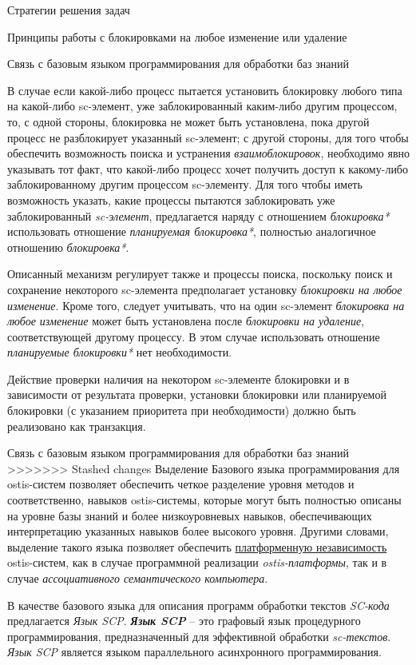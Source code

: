 \begin{frame}{Стратегии решения задач}
\begin{frame}{\large Принципы работы с блокировками на любое изменение или удаление}
\begin{frame}{Связь с базовым языком программирования для обработки баз
знаний}
\begin{frame}{}
В случае если какой-либо процесс пытается установить блокировку любого типа на какой-либо sc-элемент, уже заблокированный каким-либо другим процессом, то, с одной стороны, блокировка не может быть установлена, пока другой процесс не разблокирует указанный sc-элемент; с другой стороны, для того чтобы обеспечить возможность поиска и устранения \textit{взаимоблокировок}, необходимо явно указывать тот факт, что какой-либо процесс хочет получить доступ к какому-либо заблокированному другим процессом sc-элементу. Для того чтобы иметь возможность указать, какие процессы пытаются заблокировать уже заблокированный \textit{sc-элемент}, предлагается наряду с отношением \textit{блокировка*} использовать отношение \textit{планируемая блокировка*}, полностью аналогичное отношению \textit{блокировка*}.
\end{frame}

\begin{frame}{}
Описанный механизм регулирует также и процессы поиска, поскольку поиск и сохранение некоторого sc-элемента предполагает установку \textit{блокировки на любое изменение}. Кроме того, следует учитывать, что на один sc-элемент \textit{блокировка на любое изменение} может быть установлена после \textit{блокировки на удаление}, соответствующей другому процессу. В этом случае использовать отношение \textit{планируемые блокировки*} нет необходимости.
	
Действие проверки наличия на некотором sc-элементе блокировки и в зависимости от результата проверки, установки блокировки или планируемой блокировки (с указанием приоритета при необходимости) должно быть реализовано как транзакция.
\end{frame}

\begin{frame}{Связь с базовым языком программирования для обработки баз знаний}
\topline
\vspace{30}
 \\

>>>>>>> Stashed changes
    Выделение Базового языка программирования для ostis-систем позволяет обеспечить четкое разделение уровня методов и соответственно, навыков ostis-системы, которые могут быть полностью описаны на уровне базы знаний и более низкоуровневых навыков, обеспечивающих интерпретацию указанных навыков более высокого уровня. Другими словами, выделение такого языка позволяет обеспечить \uline{платформенную независимость} ostis-систем, как в случае программной реализации \textit{ostis-платформы}, так и в случае \textit{ассоциативного семантического компьютера}.
    \par В качестве базового языка для описания программ обработки текстов \textit{SC-кода} предлагается \textit{Язык SCP}. \textbf{\textit{Язык SCP}} -- это графовый язык процедурного программирования, предназначенный для эффективной обработки \textit{sc-текстов}. \textit{Язык SCP} является языком параллельного асинхронного программирования.
\end{frame}


\end{frame}
\end{frame}
\end{frame}
